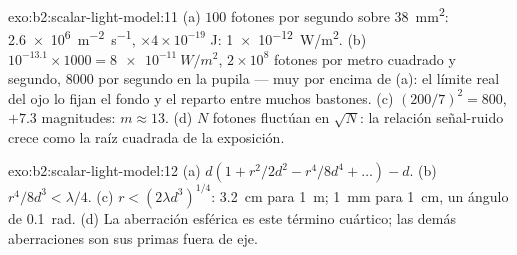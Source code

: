 \begin{solution}{exo:b2:scalar-light-model:11}
(a) $100$ fotones por segundo sobre \qty{38}{mm^2}: \qty{2.6e6}{m^{-2}.s^{-1}}, $\times4 \times
10^{-19}$ J: \qty{1e-12}{W/m^2}. (b) $10^{-13.1} \times 1000 = \qty{8e-11}{W/m^2}$, $2 \times 10^8$
fotones por metro cuadrado y segundo, $8000$ por segundo en la pupila
--- muy por encima de (a): el límite real del ojo lo fijan el fondo y
el reparto entre muchos bastones. (c) $(200/7)^2 = 800$, $+7.3$ magnitudes: $m \approx
13$. (d) $N$ fotones fluctúan en $\sqrt N$: la relación señal-ruido crece como
la raíz cuadrada de la exposición.
\end{solution}

\begin{solution}{exo:b2:scalar-light-model:12}
(a) $d(1 + r^2/2d^2 - r^4/8d^4 + \dots) - d$. (b) $r^4/8d^3 < \lambda/4$. (c) $r <
(2\lambda d^3)^{1/4}$: \qty{3.2}{cm} para \qty{1}{m}; \qty{1}{mm} para \qty{1}{cm}, un ángulo de
\qty{0.1}{rad}. (d) La aberración esférica es este término cuártico; las demás
aberraciones son sus primas fuera de eje.
\end{solution}

